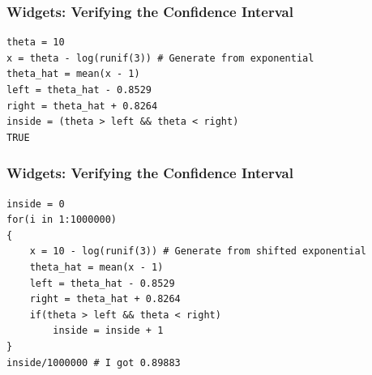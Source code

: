 \documentclass{beamer}
\begin{document}
\begin{frame}[fragile]
\frametitle{Widgets: Verifying the Confidence Interval}
\begin{verbatim}
theta = 10
x = theta - log(runif(3)) # Generate from exponential
theta_hat = mean(x - 1)
left = theta_hat - 0.8529
right = theta_hat + 0.8264
inside = (theta > left && theta < right)
TRUE
\end{verbatim}
\end{frame}

\begin{frame}[fragile]
\frametitle{Widgets: Verifying the Confidence Interval}
\begin{verbatim}
inside = 0
for(i in 1:1000000)
{
    x = 10 - log(runif(3)) # Generate from shifted exponential
    theta_hat = mean(x - 1)
    left = theta_hat - 0.8529
    right = theta_hat + 0.8264
    if(theta > left && theta < right)
        inside = inside + 1
}
inside/1000000 # I got 0.89883
\end{verbatim}
\end{frame}
\end{document}
